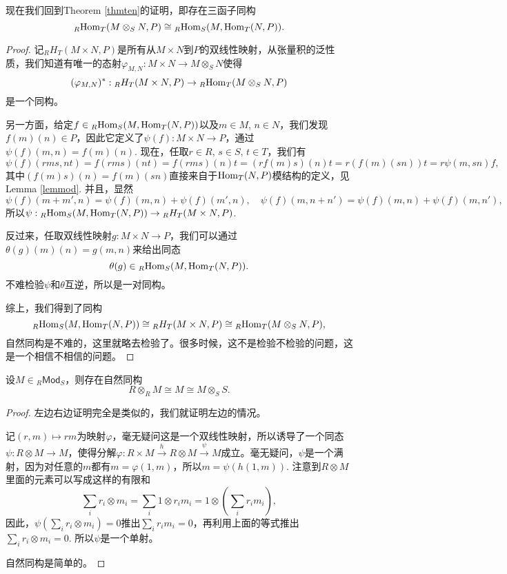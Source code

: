 \begin{para}
现在我们回到Theorem \ref{thmten}的证明，即存在三函子同构
\[
	{}_R\!\operatorname{Hom}_{T}(M\otimes_S N,P)\cong {}_R\!\operatorname{Hom}_S(M,\operatorname{Hom}_{T}(N,P)).
\]

\begin{proof}
记${}_RH_T(M\times N,P)$是所有从$M\times N$到$P$的双线性映射，从张量积的泛性质，我们知道有唯一的态射$\varphi_{M,N}:M\times N\to M\otimes_S N$使得
\[
	(\varphi_{M,N})^*:{}_RH_T(M\times N,P)\to {}_R\!\operatorname{Hom}_{T}(M\otimes_S N,P)
\]
是一个同构。

另一方面，给定$f\in {}_R\!\operatorname{Hom}_S(M,\operatorname{Hom}_{T}(N,P))$以及$m\in M$, $n\in N$，我们发现$f(m)(n)\in P$，因此它定义了$\psi(f):M\times N \to P$，通过$\psi(f)(m,n)=f(m)(n)$. 现在，任取$r\in R$, $s\in S$, $t\in T$，我们有
\[
	\psi(f)(rms,nt)=f(rms)(nt)=f(rms)(n)t=(rf(m)s)(n)t=r(f(m)(sn))t=r\psi(m,sn)f,
\]
其中$(f(m)s)(n)=f(m)(sn)$直接来自于$\operatorname{Hom}_{T}(N,P)$模结构的定义，见Lemma \ref{lemmod}. 并且，显然
\[
	\psi(f)(m+m',n)=\psi(f)(m,n)+\psi(f)(m',n),\quad \psi(f)(m,n+n')=\psi(f)(m,n)+\psi(f)(m,n'),
\]
所以$\psi:{}_R\!\operatorname{Hom}_S(M,\operatorname{Hom}_{T}(N,P))\to {}_RH_T(M\times N,P)$. 

反过来，任取双线性映射$g:M\times N \to P$，我们可以通过$\theta(g)(m)(n)=g(m,n)$来给出同态
\[
	\theta(g)\in {}_R\!\operatorname{Hom}_S(M,\operatorname{Hom}_{T}(N,P)).
\]
不难检验$\psi$和$\theta$互逆，所以是一对同构。

综上，我们得到了同构
\[
	{}_R\!\operatorname{Hom}_S(M,\operatorname{Hom}_{T}(N,P))\cong {}_RH_T(M\times N,P)\cong {}_R\!\operatorname{Hom}_{T}(M\otimes_S N,P),
\]
自然同构是不难的，这里就略去检验了。很多时候，这不是检验不检验的问题，这是一个相信不相信的问题。
\end{proof}
\end{para}

\begin{pro}
设$M\in {}_R\mathsf{Mod}_S$，则存在自然同构
\[
	R\otimes_R M\cong M\cong M\otimes_S S.
\]
\end{pro}

\begin{proof}
左边右边证明完全是类似的，我们就证明左边的情况。

记$(r,m)\mapsto rm$为映射$\varphi$，毫无疑问这是一个双线性映射，所以诱导了一个同态$\psi:R\otimes M\to M$，使得分解$\varphi:R\times M\xrightarrow{h} R\otimes M\xrightarrow{\psi} M$成立。毫无疑问，$\psi$是一个满射，因为对任意的$m$都有$m=\varphi(1,m)$，所以$m=\psi(h(1,m))$. 注意到$R\otimes M$里面的元素可以写成这样的有限和
\[
\sum_i r_i\otimes m_i=\sum_i 1\otimes r_im_i=1\otimes \left(\sum_i r_i m_i\right),
\]
因此，$\psi\left(\sum_i r_i\otimes m_i\right)=0$推出$\sum_i r_i m_i=0$，再利用上面的等式推出$\sum_i r_i\otimes m_i=0$. 所以$\psi$是一个单射。

自然同构是简单的。
\end{proof}

